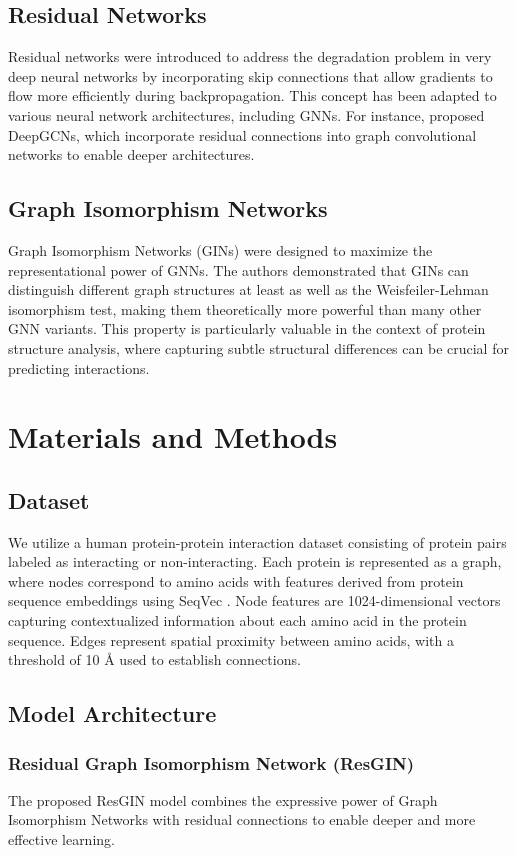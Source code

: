 \documentclass[conference]{IEEEtran}
\begin{document}
\subsection{Residual Networks}
Residual networks \cite{he2016deep} were introduced to address the degradation problem in very deep neural networks by incorporating skip connections that allow gradients to flow more efficiently during backpropagation. This concept has been adapted to various neural network architectures, including GNNs. For instance, \cite{li2019deepgcns} proposed DeepGCNs, which incorporate residual connections into graph convolutional networks to enable deeper architectures.

\subsection{Graph Isomorphism Networks}
Graph Isomorphism Networks (GINs) \cite{xu2018powerful} were designed to maximize the representational power of GNNs. The authors demonstrated that GINs can distinguish different graph structures at least as well as the Weisfeiler-Lehman isomorphism test, making them theoretically more powerful than many other GNN variants. This property is particularly valuable in the context of protein structure analysis, where capturing subtle structural differences can be crucial for predicting interactions.

\section{Materials and Methods}
\subsection{Dataset}
We utilize a human protein-protein interaction dataset consisting of protein pairs labeled as interacting or non-interacting. Each protein is represented as a graph, where nodes correspond to amino acids with features derived from protein sequence embeddings using SeqVec \cite{heinzinger2019modeling}. Node features are 1024-dimensional vectors capturing contextualized information about each amino acid in the protein sequence. Edges represent spatial proximity between amino acids, with a threshold of 10 Å used to establish connections.

\subsection{Model Architecture}
\subsubsection{Residual Graph Isomorphism Network (ResGIN)}
The proposed ResGIN model combines the expressive power of Graph Isomorphism Networks with residual connections to enable deeper and more effective learning. 
\end{document}
